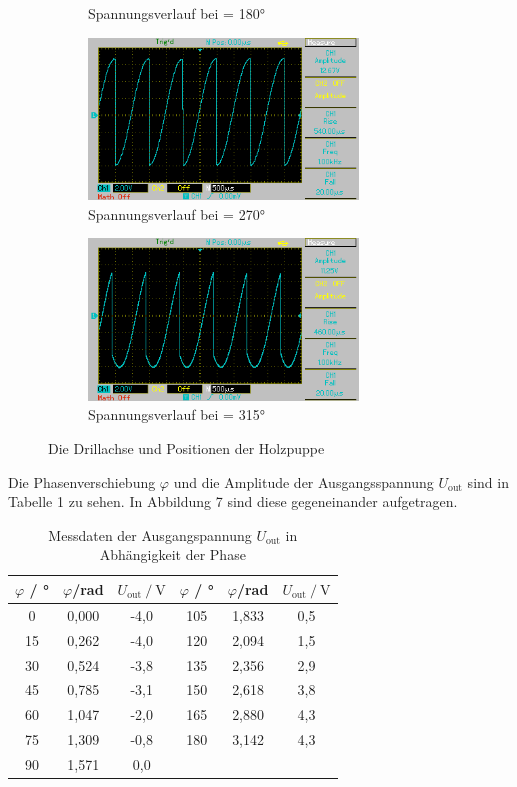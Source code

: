 \begin{figure}[H]
\begin{subfigure}{0.48\textwidth}
  \caption{Spannungsverlauf bei \varphi = 180°}
\end{subfigure}
\begin{subfigure}{0.48\textwidth}
  \centering
  \includegraphics[height=4.3cm]{MAP014.png}
  \caption{Spannungsverlauf bei \varphi = 270°}
\end{subfigure}
\begin{subfigure}{0.48\textwidth}
  \centering
  \includegraphics[height=4.3cm]{MAP015.png}
  \caption{Spannungsverlauf bei \varphi = 315°}
\end{subfigure}
\caption{Die Drillachse und Positionen der Holzpuppe}
\label{fig:versuche}
\end{figure}

Die Phasenverschiebung $\varphi$ und die Amplitude der Ausgangsspannung $U_\text{out}$ 
sind in Tabelle 1 zu sehen. In Abbildung 7 sind diese gegeneinander aufgetragen.


\begin{table}[H]
\centering
\caption{Messdaten der Ausgangspannung $U_\text{out}$ in Abhängigkeit der Phase}
\label{tab:data2}
\begin{tabular}{c c c c c c}
\toprule
$\varphi$ \:/\: ° & $\varphi$\:/\:rad  & $U_\text{out} \:/\: \si{\volt}$ & $\varphi$ \:/\: ° & $\varphi$\:/\:rad   & $U_\text{out} \:/\: \si{\volt}$\\
\midrule
0  & 0,000 & -4,0 & 105 & 1,833 & 0,5 \\
15 & 0,262 & -4,0 & 120 & 2,094 & 1,5 \\
30 & 0,524 & -3,8 & 135 & 2,356 & 2,9 \\
45 & 0,785 & -3,1 & 150 & 2,618 & 3,8 \\
60 & 1,047 & -2,0 & 165 & 2,880 & 4,3 \\
75 & 1,309 & -0,8 & 180 & 3,142 & 4,3 \\
90 & 1,571 & 0,0 & & & \\
\bottomrule
\end{tabular}
\end{table}


